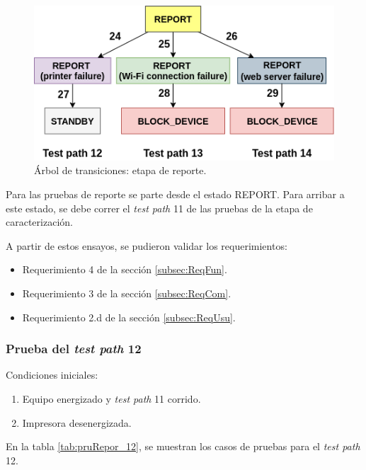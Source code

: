 \begin{figure}[htpb]
	\centering
	\includegraphics[scale=1]{./Figures/ArTrans_4.png}
	\caption{Árbol de transiciones: etapa de reporte.}
	\label{fig:ArTrans_4}
\end{figure}

Para las pruebas de reporte se parte desde el estado REPORT. Para arribar a este estado, se debe correr el \textit{test path} 11 de las pruebas de la etapa de caracterización.

A partir de estos ensayos, se pudieron validar los requerimientos: 
\begin{itemize}
\item Requerimiento 4 de la sección \ref{subsec:ReqFun}.
\item Requerimiento 3 de la sección \ref{subsec:ReqCom}.
\item Requerimiento 2.d de la sección \ref{subsec:ReqUsu}.
\end{itemize}

\pagebreak

\subsubsection{Prueba del \textit{test path} 12}
\label{subsubsec:pruRepor_12}

Condiciones iniciales: 

\begin{enumerate}
	\item Equipo energizado y \textit{test path} 11 corrido.
	\item Impresora desenergizada.
\end{enumerate}

En la tabla \ref{tab:pruRepor_12}, se muestran los casos de pruebas para el \textit{test path} 12.

